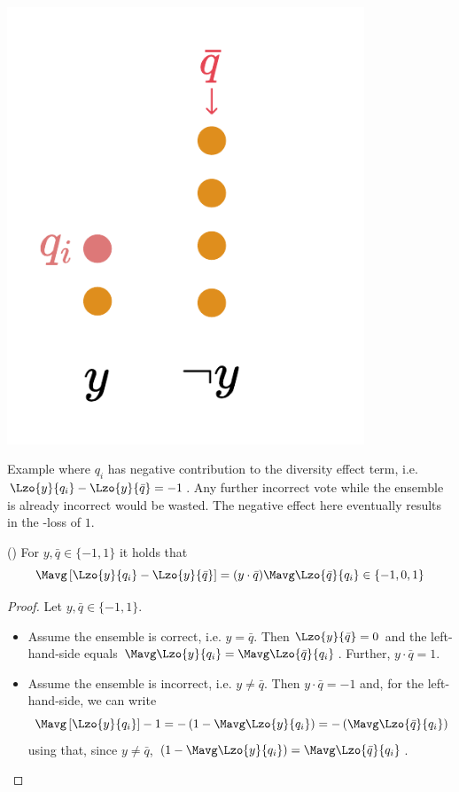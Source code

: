 \documentclass[../main.tex]{subfiles}
\begin{document}
\begin{marginfigure}
    \label{fig:zeroone-div-eff-bad}
    \includegraphics[width=0.8\textwidth]{figma-illustrations/zeroone-div-effect-bad.pdf}
    \caption{
    Example where $q_i$ has negative contribution to the diversity effect term, i.e. 
$\Lzo{y}{q_{i}} - \Lzo{y}{\bar{q}} = -1$. Any further incorrect vote while the ensemble is already incorrect would be wasted. The negative effect here eventually results in the \zeroone-loss of $1$.
}
\end{marginfigure}
\begin{lemma} (\cite{kuncheva})
For $y, \bar{q} \in \{ -1, 1 \}$ it holds that 
$$
\Mavg \left[\Lzo{y}{q_{i}} - \Lzo{y}{\bar{q}}\right] 
= (y \cdot \bar{q}) \Mavg \Lzo{\bar{q}}{q_{i}} \in \{-1, 0, 1\}
$$
\end{lemma}
\begin{proof} Let $y, \bar{q} \in \{ -1, 1 \}$.
\begin{itemize}
\item Assume the ensemble is correct, i.e. $y=\bar{q}$. Then $\Lzo{y}{\bar{q}} = 0$ and the left-hand-side equals $\Mavg\Lzo{y}{q_{i}} = \Mavg\Lzo{\bar{q}}{q_{i}}$. Further, $y \cdot \bar{q} = 1$.
\item Assume the ensemble is incorrect, i.e. $y \not= \bar{q}$. Then $y \cdot \bar{q} = -1$ and, for the left-hand-side, we can write
$$
\Mavg \left[\Lzo{y}{q_{i}}\right] - 1 = - \left(1 - \Mavg \Lzo{y}{q_{i}}\right) = - \left(\Mavg \Lzo{\bar{q}}{q_{i}} \right)
$$
using that, since $y \not= \bar{q}$, $\left(  1 - \Mavg \Lzo{y}{q_{i}}\right) = \Mavg \Lzo{\bar{q}}{q_{i}}$.
\end{itemize}
\end{proof}
\end{document}
